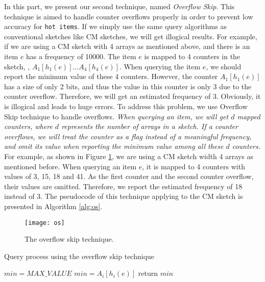 In this part, we present our second technique, named \textit{Overflow Skip}.
This technique is aimed to handle counter overflows properly in order to prevent low accuracy for \texttt{hot items}.
If we simply use the same query algorithms as conventional sketches like CM sketches, we will get illogical results.
For example, if we are using a CM sketch with 4 arrays as mentioned above, and there is an item $e$ has a frequency of 10000. The item $e$ is mapped to 4 counters in the sketch, \ie, $A_1[h_1(e)] \dots A_4[h_4(e)]$. When querying the item $e$, we should report the minimum value of these 4 counters. However, the counter $A_1[h_1(e)]$ has a size of only 2 bits, and thus the value in this counter is only 3 due to the counter overflow.
Therefore, we will get an estimated frequency of 3.
Obviously, it is illogical and leads to huge errors.
To address this problem, we use Overflow Skip technique to handle overflows.
\textit{When querying an item, we will get $d$ mapped counters, where $d$ represents the number of arrays in a sketch. If a counter overflows, we will treat the counter as a flag instead of a meaningful frequency, and omit its value when reporting the minimum value among all these $d$ counters.}
For example, as shown in Figure \ref{draw:os}, we are using a CM sketch width 4 arrays as mentioned before.
When querying an item $e$, it is mapped to 4 counters with values of 3, 15, 18 and 41.
As the first counter and the second counter overflow, their values are omitted.
Therefore, we report the estimated frequency of 18 instead of 3.
The pseudocode of this technique applying to the CM sketch is presented in Algorithm \ref{alg:os}.

\begin{figure}[htbp]
	\centering
	\texttt{[image: os]}
	\caption{The overflow skip technique.} 
	\label{draw:os}
\end{figure}

\begin{algorithm}[h]
	\caption{Query process using the overflow skip technique}
	\label{alg:os}
	
	$min=MAX\_VALUE$\;
	{
		{
			{
				$min=A_i[h_i(e)]$\;
			}
		}
	}
	return $min$\;
\end{algorithm}


